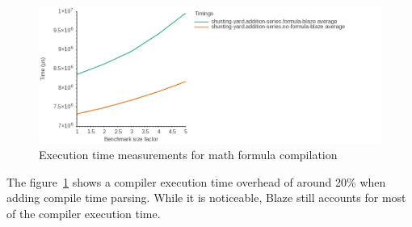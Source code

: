 \documentclass[../main]{subfiles}
\begin{document}
\begin{figure}
\includegraphics[scale=0.5]{
  images/shunting-yard.addition-series.graph.png
}
\caption{Execution time measurements for math formula compilation
}\label{fig:sy-rubbish-benchmark-graph}
\end{figure}

The figure~\ref{fig:sy-rubbish-benchmark-graph} shows a compiler execution time
overhead of around 20\% when adding compile time parsing.
While it is noticeable, Blaze still accounts for most of the compiler execution
time.

\clearpage%
\end{document}
